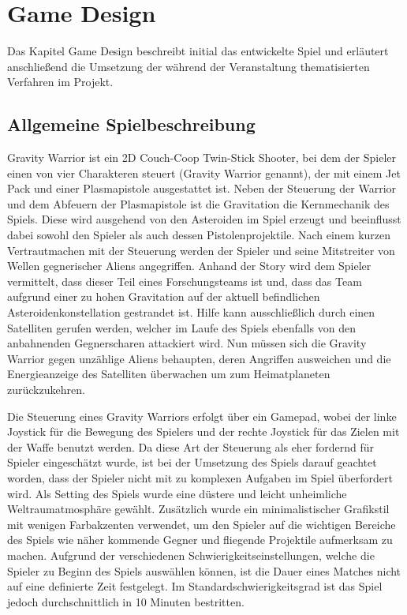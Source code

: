 \documentclass[11pt]{scrartcl}
\begin{document}
\newpage
\section{Game Design}
Das Kapitel Game Design beschreibt initial das entwickelte Spiel und erläutert anschließend die Umsetzung der während der Veranstaltung thematisierten Verfahren im Projekt.
\subsection{Allgemeine Spielbeschreibung}
Gravity Warrior ist ein 2D Couch-Coop Twin-Stick Shooter, bei dem der Spieler einen von vier Charakteren steuert (Gravity Warrior genannt), der mit einem Jet Pack und einer Plasmapistole ausgestattet ist. Neben der Steuerung der Warrior und dem Abfeuern der Plasmapistole ist die Gravitation die Kernmechanik des Spiels. Diese wird ausgehend von den Asteroiden im Spiel erzeugt und beeinflusst dabei sowohl den Spieler als auch dessen Pistolenprojektile. Nach einem kurzen Vertrautmachen mit der Steuerung werden der Spieler und seine Mitstreiter von Wellen gegnerischer Aliens angegriffen. Anhand der Story wird dem Spieler vermittelt, dass dieser Teil eines Forschungsteams ist und, dass das Team aufgrund einer zu hohen Gravitation auf der aktuell befindlichen Asteroidenkonstellation gestrandet ist. Hilfe kann ausschließlich durch einen Satelliten gerufen werden, welcher im Laufe des Spiels ebenfalls von den anbahnenden Gegnerscharen attackiert wird. Nun müssen sich die Gravity Warrior gegen unzählige Aliens behaupten, deren Angriffen ausweichen und die Energieanzeige des Satelliten überwachen um zum Heimatplaneten zurückzukehren.

Die Steuerung eines Gravity Warriors erfolgt über ein Gamepad, wobei der linke Joystick für die Bewegung des Spielers und der rechte Joystick für das Zielen mit der Waffe benutzt werden. Da diese Art der Steuerung als eher fordernd für Spieler eingeschätzt wurde, ist bei der Umsetzung des Spiels darauf geachtet worden, dass der Spieler nicht mit zu komplexen Aufgaben im Spiel überfordert wird. Als Setting des Spiels wurde eine düstere und leicht unheimliche Weltraumatmosphäre gewählt. Zusätzlich wurde ein minimalistischer Grafikstil mit wenigen Farbakzenten verwendet, um den Spieler auf die wichtigen Bereiche des Spiels wie näher kommende Gegner und fliegende Projektile aufmerksam zu machen. Aufgrund der verschiedenen Schwierigkeitseinstellungen, welche die Spieler zu Beginn des Spiels auswählen können, ist die Dauer eines Matches nicht auf eine definierte Zeit festgelegt. Im Standardschwierigkeitsgrad ist das Spiel jedoch durchschnittlich in 10 Minuten bestritten.
\end{document}
